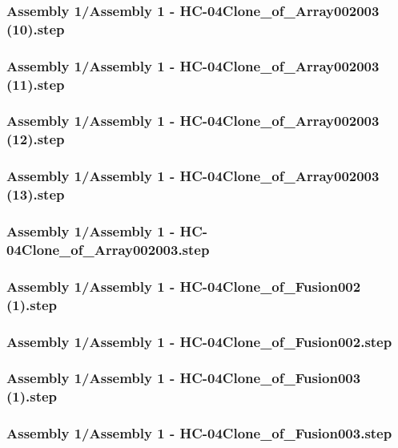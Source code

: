 \documentclass[a4paper,12pt]{article}
\begin{document}
\subsubsection{Assembly 1/Assembly 1 - HC-04Clone_of_Array002003 (10).step}

\subsubsection{Assembly 1/Assembly 1 - HC-04Clone_of_Array002003 (11).step}

\subsubsection{Assembly 1/Assembly 1 - HC-04Clone_of_Array002003 (12).step}

\subsubsection{Assembly 1/Assembly 1 - HC-04Clone_of_Array002003 (13).step}

\subsubsection{Assembly 1/Assembly 1 - HC-04Clone_of_Array002003.step}

\subsubsection{Assembly 1/Assembly 1 - HC-04Clone_of_Fusion002 (1).step}

\subsubsection{Assembly 1/Assembly 1 - HC-04Clone_of_Fusion002.step}

\subsubsection{Assembly 1/Assembly 1 - HC-04Clone_of_Fusion003 (1).step}

\subsubsection{Assembly 1/Assembly 1 - HC-04Clone_of_Fusion003.step}

\end{document}
